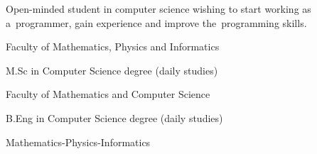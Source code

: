 \documentclass[11pt,a4paper]{article}
\begin{document}
    \vspace{0.4cm}
  
    \smallskip
    \noindent
    Open-minded student in computer science wishing to start working as a~programmer,\linebreak
    gain experience and improve the~programming skills.
  
  
    \vspace{0.5cm}
  
    \medskip
    \vspace{-1.6mm}
    \begin{description} \itemsep0pt \parskip0pt 
        \item[ ] Faculty of Mathematics, Physics and Informatics
        \item[ ] M.Sc in Computer Science degree (daily studies)
    \end{description}
  
    \vspace{-1.6mm}
    \begin{description} \itemsep0pt \parskip0pt 
        \item[ ] Faculty of Mathematics and Computer Science
        \item[ ] B.Eng in Computer Science degree (daily studies)
    \end{description}
  
    \vspace{-1.6mm}
    \begin{description} \itemsep0pt \parskip0pt 
        \item[ ] Mathematics-Physics-Informatics
    \end{description}
  
  
    \vspace{0.3cm}
  
  
\end{document}
